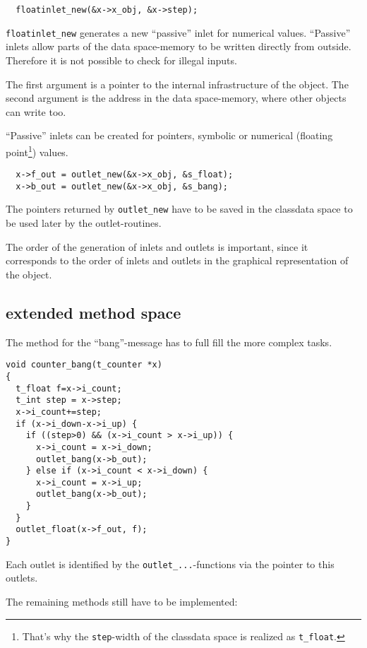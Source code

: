 \documentclass[12pt, a4paper,english,titlepage]{article}
\begin{document}
\begin{verbatim}
  floatinlet_new(&x->x_obj, &x->step);
\end{verbatim}
\verb+floatinlet_new+ generates a new ``passive'' inlet for numerical values.
``Passive'' inlets allow parts of the data space-memory to be written directly 
from outside.
Therefore it is not possible to check for illegal inputs.

The first argument is a pointer to the internal infrastructure of the object.
The second argument is the address in the data space-memory,
where other objects can write too.

``Passive'' inlets can be created for pointers, symbolic or
numerical (floating point\footnote{
That's why the {\tt step}-width of the class\/data space is realized as {\tt t\_float}.})
values.


\begin{verbatim}
  x->f_out = outlet_new(&x->x_obj, &s_float);
  x->b_out = outlet_new(&x->x_obj, &s_bang);
\end{verbatim}

The pointers returned by \verb+outlet_new+ have to be saved in the class\/data space
to be used later by the outlet-routines.

The order of the generation of inlets and outlets is important,
since it corresponds to the order of inlets and outlets in the
graphical representation of the object.

\subsection{extended method space}

The method for the ``bang''-message has to full fill the more complex tasks.

\begin{verbatim}
void counter_bang(t_counter *x)
{
  t_float f=x->i_count;
  t_int step = x->step;
  x->i_count+=step;
  if (x->i_down-x->i_up) {
    if ((step>0) && (x->i_count > x->i_up)) {
      x->i_count = x->i_down;
      outlet_bang(x->b_out);
    } else if (x->i_count < x->i_down) {
      x->i_count = x->i_up;
      outlet_bang(x->b_out);
    }
  }
  outlet_float(x->f_out, f);
}
\end{verbatim}

Each outlet is identified by the \verb+outlet_...+-functions via the
pointer to this outlets.

The remaining methods still have to be implemented:
\end{document}
